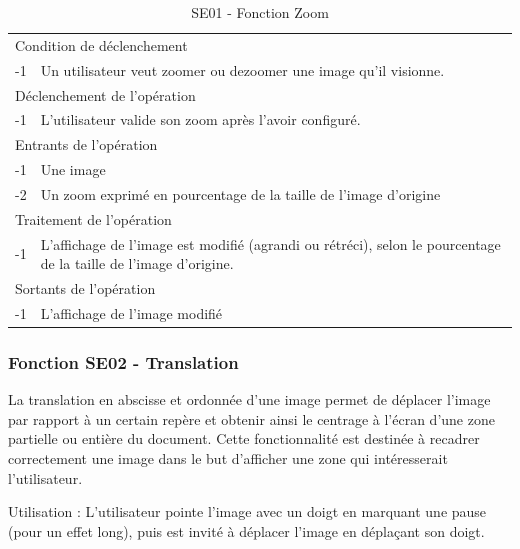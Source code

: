\documentclass[a4paper]{article}
\begin{document}
\begin{table}[H]
  \centering
   \small
	\begin{tabular}{|c|p{12cm}|}
   		\hline
   			\rowcolor{lightgray}\multicolumn{2}{|c|}{\textbf{SE01 - Fonction Zoom}} \\
   		\hline
   			\multicolumn{2}{|l|}{Condition de d\'eclenchement} \\
   		\hline
   			-1 & Un utilisateur veut zoomer ou dezoomer une image qu'il visionne. \\
   		\hline
   			\multicolumn{2}{|l|}{D\'eclenchement de l'op\'eration} \\
   		\hline
   			-1 & L'utilisateur valide son zoom après l'avoir configuré. \\
   		\hline
   			\multicolumn{2}{|l|}{Entrants de l'op\'eration} \\
   		\hline
   			-1 & Une image \\
        	-2 & Un zoom exprimé en pourcentage de la taille de l'image d'origine \\ 	
        \hline
   			\multicolumn{2}{|l|}{Traitement de l'op\'eration} \\
  		\hline
   			-1 & L'affichage de l'image est modifié (agrandi ou rétréci), selon le pourcentage de la taille de l'image d'origine. \\
   		\hline
   			\multicolumn{2}{|l|}{Sortants de l'op\'eration} \\
   		\hline
   			-1 & L'affichage de l'image modifié \\
   		\hline
	\end{tabular}
  \caption{SE01 - Fonction Zoom}
  \normalsize
  \label{tab:visu_img_zoom}
\end{table}


\subsubsection{Fonction SE02 - Translation}

La translation en abscisse et ordonnée d'une image permet de déplacer l'image par rapport à un certain repère et obtenir ainsi le centrage à l'écran d'une zone partielle ou entière du document. Cette fonctionnalité est destinée à recadrer correctement une image dans le but d'afficher une zone qui intéresserait l'utilisateur.

Utilisation : L'utilisateur pointe l'image avec un doigt en marquant une pause (pour un effet long), puis est invité à déplacer l'image en déplaçant son doigt.
\end{document}
